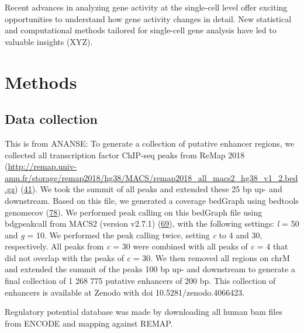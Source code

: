Recent advances in analyzing gene activity at the single-cell level offer exciting opportunities to understand how gene activity changes in detail. New statistical and computational methods tailored for single-cell gene analysis have led to valuable insights (XYZ). 


\section{Methods}

\subsection{Data collection}

This is from ANANSE:
To generate a collection of putative enhancer regions, we collected all transcription factor ChIP-seq peaks from ReMap 2018 (\href{http://remap.univ-amu.fr/storage/remap2018/hg38/MACS/remap2018_all_macs2_hg38_v1_2.bed.gz}{http://remap.univ-amu.fr/storage/remap2018/hg38/MACS/remap2018\_all\_macs2\_hg38\_v1\_2.bed.gz}) (\href{javascript:;}{41}). We took the summit of all peaks and extended these 25 bp up- and downstream. Based on this file, we generated a coverage bedGraph using bedtools genomecov (\href{javascript:;}{78}). We performed peak calling on this bedGraph file using bdgpeakcall from MACS2 (version v2.7.1) (\href{javascript:;}{69}), with the following settings: \textit{l} = 50 and \textit{g} = 10. We performed the peak calling twice, setting \textit{c} to 4 and 30, respectively. All peaks from \textit{c} = 30 were combined with all peaks of \textit{c} = 4 that did not overlap with the peaks of \textit{c} = 30. We then removed all regions on chrM and extended the summit of the peaks 100 bp up- and downstream to generate a final collection of 1 268 775 putative enhancers of 200 bp. This collection of enhancers is available at Zenodo with doi 10.5281/zenodo.4066423.

Regulatory potential database was made by downloading all human bam files from ENCODE and mapping against REMAP.

